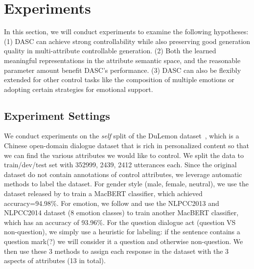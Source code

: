 \section{Experiments}
\label{sec:exps}
In this section, we will conduct experiments to examine the following hypotheses: (1) DASC can achieve strong controllability while also preserving good generation quality in multi-attribute controllable generation. (2) Both the learned meaningful representations in the attribute semantic space, and the reasonable parameter amount benefit DASC's performance. (3) DASC can also be flexibly extended for other control tasks like the composition of multiple emotions or adopting certain strategies for emotional support. 

\subsection{Experiment Settings}
We conduct experiments on the \textit{self} split of the DuLemon dataset~\citep{xu2022long}, which is a Chinese open-domain dialogue dataset that is rich in personalized content so that we can find the various attributes we would like to control. We split the data to train/dev/test set with 352999, 2439, 2412 utterances each. Since the original dataset do not contain annotations of control attributes, we leverage automatic methods to label the dataset. For gender style (male, female, neutral), we use the dataset released by \citet{su2020stylistic} to train a MacBERT classifier, which achieved accuracy=94.98\%. For emotion, we follow \citet{zhou2018emotional} and use the NLPCC2013 and NLPCC2014 dataset (8 emotion classes) to train another MacBERT classifier, which has an accuracy of 93.96\%. For the question dialogue act (question VS non-question), we simply use a heuristic for labeling: if the sentence contains a question mark(?) we will consider it a question and otherwise non-question. We then use these 3 methods to assign each response in the dataset with the 3 aspects of attributes (13 in total). 

